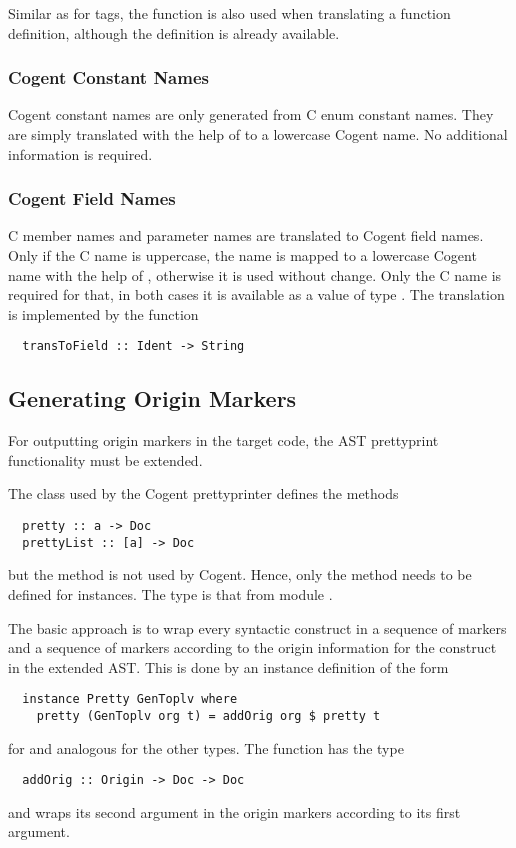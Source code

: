 Similar as for tags, the function is also used when translating a function definition, although the 
definition is already available.

\subsubsection{Cogent Constant Names}

Cogent constant names are only generated from C enum constant names. They are simply translated
with the help of  to a lowercase Cogent name. No additional information is required.

\subsubsection{Cogent Field Names}

C member names and parameter names are translated to Cogent field names. Only if the C name is
uppercase, the name is mapped to a lowercase Cogent name with the help of , 
otherwise it is used without change. Only the C name is required for that, in both cases it is
available as a value of type . The translation is implemented by the function
\begin{verbatim}
  transToField :: Ident -> String
\end{verbatim}

\subsection{Generating Origin Markers}
\label{impl-ccode-origin}

For outputting origin markers in the target code, the AST prettyprint functionality must be extended.

The class  used by the Cogent prettyprinter defines the methods
\begin{verbatim}
  pretty :: a -> Doc
  prettyList :: [a] -> Doc
\end{verbatim}
but the method  is not used by Cogent. Hence, only the method  needs to be defined
for instances. The type  is that from module .

The basic approach is to wrap every syntactic construct in a sequence of  markers and 
a sequence of  markers according to the origin information for the construct in the extended AST. 
This is done by an instance definition of the form
\begin{verbatim}
  instance Pretty GenToplv where
    pretty (GenToplv org t) = addOrig org $ pretty t
\end{verbatim}
for  and analogous for the other types. The function  has the type
\begin{verbatim}
  addOrig :: Origin -> Doc -> Doc
\end{verbatim}
and wraps its second argument in the origin markers according to its first argument.

